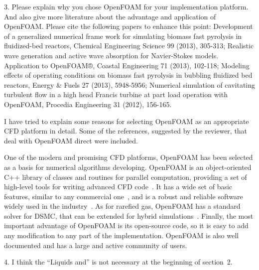 \documentclass{article}
\begin{document}
\begin{quoting}
3. Please explain why you chose OpenFOAM for your implementation
platform. And also give more literature about the advantage and
application of OpenFOAM. Please cite the following papers to enhance
this point: Development of a generalized numerical frame work for
simulating biomass fast pyrolysis in fluidized-bed reactors, Chemical
Engineering Science 99 (2013), 305-313; Realistic wave generation and
active wave absorption for Navier-Stokes models. Application to OpenFOAM®,
Coastal Engineering 71 (2013), 102-118; Modeling effects of operating
conditions on biomass fast pyrolysis in bubbling fluidized bed reactors,
Energy \& Fuels 27 (2013), 5948-5956; Numerical simulation of cavitating
turbulent flow in a high head Francis turbine at part load operation
with OpenFOAM, Procedia Engineering 31 (2012), 156-165.
\end{quoting}

I have tried to explain some reasons for selecting
OpenFOAM\textregistered{} as an appropriate CFD platform in detail. Some
of the references, suggested by the reviewer, that deal with
OpenFOAM\textregistered{} direct were included.

\begin{leftbar}
One of the modern and promising CFD platforms, OpenFOAM\textregistered{}
has been selected as a basis for numerical algorithms developing.
OpenFOAM\textregistered{} is an object-oriented C++ library of classes and routines for parallel computation,
providing a set of high-level tools for writing advanced CFD code~\cite{OpenFOAM1998}.
It has a wide set of basic features, similar to any commercial one~\cite{OpenFOAM2010},
and is a robust and reliable software widely used in the industry~\cite{BoilingFlows2009,
TurbulentCombustion2011, CoastalEngineering2013, BiomassPyrolysis2013}.
As for rarefied gas, OpenFOAM\textregistered{} has a standard solver for DSMC, that
can be extended for hybrid simulations~\cite{HybridSolver2012}.
Finally, the most important advantage of OpenFOAM\textregistered{} is its open-source code,
so it is easy to add any modification to any part of the implementation.
OpenFOAM\textregistered{} is also well documented and has a large and active community of users.
\end{leftbar}

\begin{quoting}
4. I think the ``Liquids and'' is not necessary at the beginning of
section~2.
\end{quoting}
\end{document}
